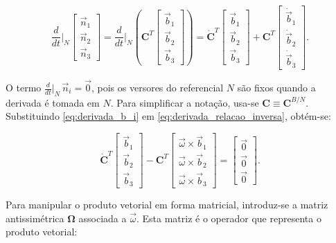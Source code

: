 \begin{equation}
\frac{d}{dt}\bigg|_N
\begin{bmatrix}
\vec{n}_1 \\
\vec{n}_2 \\
\vec{n}_3
\end{bmatrix}
=
\frac{d}{dt}\bigg|_N
\left(
\mathbf{C}^{T}
\begin{bmatrix}
\vec{b}_1 \\
\vec{b}_2 \\
\vec{b}_3
\end{bmatrix}
\right)
=
\dot{\mathbf{C}}^{T}
\begin{bmatrix}
\vec{b}_1 \\
\vec{b}_2 \\
\vec{b}_3
\end{bmatrix}
+
\mathbf{C}^{T}
\begin{bmatrix}
\dot{\vec{b}}_1 \\
\dot{\vec{b}}_2 \\
\dot{\vec{b}}_3
\end{bmatrix}.
\label{eq:derivada_relacao_inversa}
\end{equation}

O termo $\frac{d}{dt}\big|_N\,\vec{n}_i=\vec{0}$, pois os versores do referencial $N$ são fixos quando a derivada é tomada em $N$.
Para simplificar a notação, usa-se $\mathbf{C}\equiv\mathbf{C}^{B/N}$.
Substituindo \eqref{eq:derivada_b_i} em \eqref{eq:derivada_relacao_inversa}, obtém-se:

\begin{equation}
\dot{\mathbf{C}}^{T}
\begin{bmatrix}
\vec{b}_1 \\
\vec{b}_2 \\
\vec{b}_3
\end{bmatrix}
-
\mathbf{C}^{T}
\begin{bmatrix}
\vec{\omega}\times\vec{b}_1 \\
\vec{\omega}\times\vec{b}_2 \\
\vec{\omega}\times\vec{b}_3
\end{bmatrix}
=
\begin{bmatrix}
\vec{0} \\
\vec{0} \\
\vec{0}
\end{bmatrix}.
\end{equation}

Para manipular o produto vetorial em forma matricial, introduz-se a matriz antissimétrica $\boldsymbol{\Omega}$ associada a $\vec{\omega}$. Esta matriz é o operador que representa o produto vetorial:


